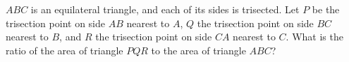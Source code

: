 $ABC$ is an equilateral triangle, and each of its sides is trisected. Let $P$ be the trisection point on side $AB$ nearest to $A$, $Q$ the trisection point on side $BC$ nearest to $B$, and $R$ the trisection point on side $CA$ nearest to $C$. What is the ratio of the area of triangle $PQR$ to the area of triangle $ABC$?
